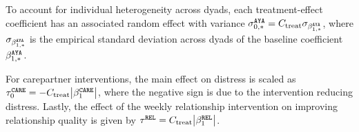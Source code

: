 To account for individual heterogeneity across dyads, each treatment-effect coefficient has an associated random effect with variance $\sigma_{0, *}^{\tiny\texttt{AYA}} = C_{\text{treat}} \sigma_{\beta_{1, *}^{\tiny\texttt{AYA}}}$, where $\sigma_{\beta_{1, *}^{\tiny\texttt{AYA}}}$ is the empirical standard deviation across dyads of the baseline coefficient $\beta_{1, *}^{\tiny\texttt{AYA}}$. 

For carepartner interventions, the main effect on distress is scaled as $\tau_{0}^{\tiny\texttt{CARE}} = -C_{\text{treat}} \bigl|\beta_{1}^{\tiny\texttt{CARE}}\bigr|$, where the negative sign is due to the intervention reducing distress. Lastly, the effect of the weekly relationship intervention on improving relationship quality is given by $\tau^{\tiny\texttt{REL}} = C_{\text{treat}} \bigl|\beta_{1}^{\tiny\texttt{REL}}\bigr|$.


